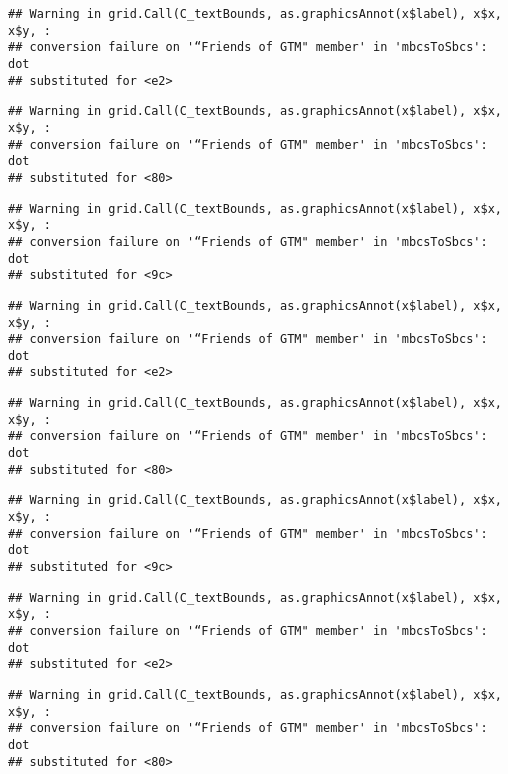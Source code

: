 \documentclass[
]{article}
\begin{document}
\begin{verbatim}
## Warning in grid.Call(C_textBounds, as.graphicsAnnot(x$label), x$x, x$y, :
## conversion failure on '“Friends of GTM" member' in 'mbcsToSbcs': dot
## substituted for <e2>
\end{verbatim}

\begin{verbatim}
## Warning in grid.Call(C_textBounds, as.graphicsAnnot(x$label), x$x, x$y, :
## conversion failure on '“Friends of GTM" member' in 'mbcsToSbcs': dot
## substituted for <80>
\end{verbatim}

\begin{verbatim}
## Warning in grid.Call(C_textBounds, as.graphicsAnnot(x$label), x$x, x$y, :
## conversion failure on '“Friends of GTM" member' in 'mbcsToSbcs': dot
## substituted for <9c>
\end{verbatim}

\begin{verbatim}
## Warning in grid.Call(C_textBounds, as.graphicsAnnot(x$label), x$x, x$y, :
## conversion failure on '“Friends of GTM" member' in 'mbcsToSbcs': dot
## substituted for <e2>
\end{verbatim}

\begin{verbatim}
## Warning in grid.Call(C_textBounds, as.graphicsAnnot(x$label), x$x, x$y, :
## conversion failure on '“Friends of GTM" member' in 'mbcsToSbcs': dot
## substituted for <80>
\end{verbatim}

\begin{verbatim}
## Warning in grid.Call(C_textBounds, as.graphicsAnnot(x$label), x$x, x$y, :
## conversion failure on '“Friends of GTM" member' in 'mbcsToSbcs': dot
## substituted for <9c>
\end{verbatim}

\begin{verbatim}
## Warning in grid.Call(C_textBounds, as.graphicsAnnot(x$label), x$x, x$y, :
## conversion failure on '“Friends of GTM" member' in 'mbcsToSbcs': dot
## substituted for <e2>
\end{verbatim}

\begin{verbatim}
## Warning in grid.Call(C_textBounds, as.graphicsAnnot(x$label), x$x, x$y, :
## conversion failure on '“Friends of GTM" member' in 'mbcsToSbcs': dot
## substituted for <80>
\end{verbatim}
\end{document}
